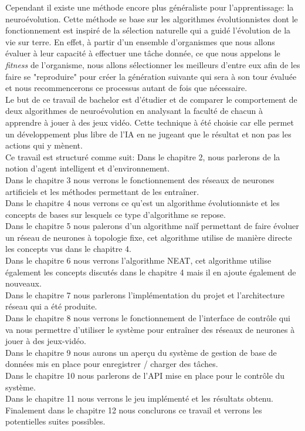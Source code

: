 \documentclass{article}
\begin{document}
Cependant il existe une méthode encore plus généraliste pour l'apprentissage: la neuroévolution. Cette méthode se base sur les algorithmes évolutionnistes dont le fonctionnement est inspiré de la sélection naturelle qui a guidé l'évolution de la vie sur terre. En effet, à partir d'un ensemble d'organismes que nous allons évaluer à leur capacité à effectuer une tâche donnée, ce que nous appelons le \textit{fitness} de l'organisme, nous allons sélectionner les meilleurs d'entre eux afin de les faire se "reproduire" pour créer la génération suivante qui sera à son tour évaluée et nous recommencerons ce processus autant de fois que nécessaire\cite{wikineuroevolution}.\\

Le but de ce travail de bachelor est d'étudier et de comparer le comportement de deux algorithmes de neuroévolution en analysant la faculté de chacun à apprendre à jouer à des jeux vidéo. Cette technique à été choisie car elle permet un développement plus libre de l'IA en ne jugeant que le résultat et non pas les actions qui y mènent.\\

Ce travail est structuré comme suit: Dans le chapitre 2, nous parlerons de la notion d'agent intelligent et d'environnement.\\
Dans le chapitre 3 nous verrons le fonctionnement des réseaux de neurones artificiels et les méthodes permettant de les entraîner.\\
Dans le chapitre 4 nous verrons ce qu'est un algorithme évolutionniste et les concepts de bases sur lesquels ce type d'algorithme se repose.\\
Dans le chapitre 5 nous palerons d'un algorithme naïf permettant de faire évoluer un réseau de neurones à topologie fixe, cet algorithme utilise de manière directe les concepts vus dans le chapitre 4.\\
Dans le chapitre 6 nous verrons l'algorithme NEAT, cet algorithme utilise également les concepts discutés dans le chapitre 4 mais il en ajoute également de nouveaux.\\
Dans le chapitre 7 nous parlerons l'implémentation du projet et l'architecture réseau qui a été produite.\\
Dans le chapitre 8 nous verrons le fonctionnement de l'interface de contrôle qui va nous permettre d'utiliser le système pour entraîner des réseaux de neurones à jouer à des jeux-vidéo.\\
Dans le chapitre 9 nous aurons un aperçu du système de gestion de base de données mis en place pour enregistrer / charger des tâches.\\
Dans le chapitre 10 nous parlerons de l'API mise en place pour le contrôle du système.\\
Dans le chapitre 11 nous verrons le jeu implémenté et les résultats obtenu.\\
Finalement dans le chapitre 12 nous conclurons ce travail et verrons les potentielles suites possibles.
\newpage
\end{document}
